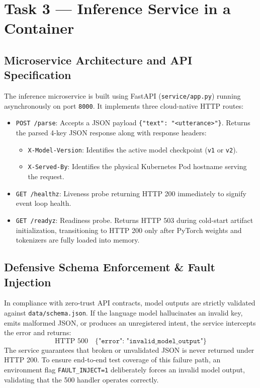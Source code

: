 \documentclass[10pt,a4paper]{article}
\begin{document}
\vspace{0.25cm}

\section{Task 3 --- Inference Service in a Container}

\subsection{Microservice Architecture and API Specification}
The inference microservice is built using FastAPI (\texttt{service/app.py}) running asynchronously on port \texttt{8000}. It implements three cloud-native HTTP routes:
\begin{itemize}[noitemsep,topsep=2pt,leftmargin=*]
    \item \texttt{POST /parse}: Accepts a JSON payload \texttt{\{"text": "<utterance>"\}}. Returns the parsed 4-key JSON response along with response headers:
    \begin{itemize}[noitemsep,leftmargin=*]
        \item \texttt{X-Model-Version}: Identifies the active model checkpoint (\texttt{v1} or \texttt{v2}).
        \item \texttt{X-Served-By}: Identifies the physical Kubernetes Pod hostname serving the request.
    \end{itemize}
    \item \texttt{GET /healthz}: Liveness probe returning HTTP 200 immediately to signify event loop health.
    \item \texttt{GET /readyz}: Readiness probe. Returns HTTP 503 during cold-start artifact initialization, transitioning to HTTP 200 only after PyTorch weights and tokenizers are fully loaded into memory.
\end{itemize}

\subsection{Defensive Schema Enforcement \& Fault Injection}
In compliance with zero-trust API contracts, model outputs are strictly validated against \texttt{data/schema.json}. If the language model hallucinates an invalid key, emits malformed JSON, or produces an unregistered intent, the service intercepts the error and returns:
$$\text{HTTP } 500 \quad \texttt{\{"error": "invalid\_model\_output"\}}$$
The service guarantees that broken or unvalidated JSON is never returned under HTTP 200. To ensure end-to-end test coverage of this failure path, an environment flag \texttt{FAULT\_INJECT=1} deliberately forces an invalid model output, validating that the 500 handler operates correctly.
\end{document}
